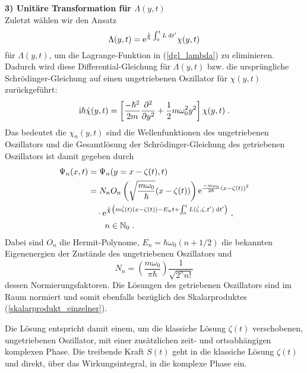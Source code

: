   \textbf{3) Unitäre Transformation für $\Lambda(y,t)$}\\
  Zuletzt wählen wir den Ansatz
  \begin{equation}
    \Lambda(y,t) = \text e^{\frac{\text i}{\hbar}\int_0^tL \: \text d t'}\chi(y,t)
  \end{equation}
  für $\Lambda(y,t)$, um die Lagrange-Funktion in (\ref{dgl_lambda}) zu eliminieren.
  Dadurch wird diese Differential-Gleichung für $\Lambda(y,t)$ bzw. die ursprüngliche Schrödinger-Gleichung auf einen ungetriebenen Oszillator für $\chi(y,t)$ zurückgeführt:
  \begin{equation}
    \text i \hbar \dot \chi(y,t) = \left[ \frac{-\hbar^2}{2m}\frac{\partial^2}{\partial y^2} + \frac{1}{2}m\omega_0^2y^2 \right]\chi(y,t) \; .
  \end{equation}
  Das bedeutet die $\chi_n(y,t)$ sind die Wellenfunktionen des ungetriebenen Oszillators und die Gesamtlösung der Schrödinger-Gleichung des getriebenen Oszillators ist damit gegeben durch
  \begin{align}
    \begin{split}
    \Psi_n(x,t) &= \Psi_n(y=x-\zeta(t),t) \\
    &= N_nO_n\left(\sqrt{\frac{m\omega_0}{\hbar}}(x-\zeta(t))\right) \text e^{\frac{-m\omega_0}{2\hbar}(x-\zeta(t))^2} \\
    &\quad \cdot \text e^{\frac{\text i}{\hbar}\left(m\dot \zeta(t)(x-\zeta(t))-E_nt+\int_0^tL(\dot \zeta,\zeta,t')\:\text dt'\right)} \; , \\
    &\quad \quad n \in \mathbb{N}_0 \; .
    \label{gesamtlsg_einzelner}
  \end{split}
  \end{align}
  Dabei sind $O_n$ die Hermit-Polynome, $E_n = \hbar \omega_0(n+1/2)$ die bekannten Eigenenergien der Zustände des ungetriebenen Oszillators und
  \begin{equation}
    N_n = \left(\frac{m\omega_0}{\pi \hbar}\right) \frac{1}{\sqrt{2^nn!}}
  \end{equation}
  dessen Normierungsfaktoren.
  Die Lösungen des getriebenen Oszillators sind im Raum normiert und somit ebenfalls bezüglich des Skalarproduktes (\ref{skalarprodukt_einzelner}).

  Die Lösung entspricht damit einem, um die klassiche Lösung $\zeta(t)$ verschobenen, ungetriebenen Oszillator, mit einer zusätzlichen zeit- und ortsabhängigen komplexen Phase.
  Die treibende Kraft $S(t)$ geht in die klassiche Lösung $\zeta(t)$ und direkt, über das Wirkungsintegral, in die komplexe Phase ein.



